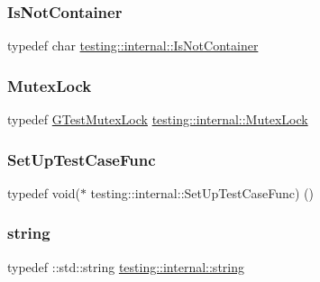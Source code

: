 \mbox{\label{namespacetesting_1_1internal_abf080521ce135deb510e0a7830fd3d33}} 
\subsubsection{\texorpdfstring{IsNotContainer}{IsNotContainer}}
{\footnotesize\ttfamily typedef char \mbox{\hyperlink{namespacetesting_1_1internal_abf080521ce135deb510e0a7830fd3d33}{testing\+::internal\+::\+Is\+Not\+Container}}}

\mbox{\label{namespacetesting_1_1internal_a08b187c6cc4e28400aadf9a32fccc8de}} 
\subsubsection{\texorpdfstring{MutexLock}{MutexLock}}
{\footnotesize\ttfamily typedef \mbox{\hyperlink{classtesting_1_1internal_1_1_g_test_mutex_lock}{G\+Test\+Mutex\+Lock}} \mbox{\hyperlink{namespacetesting_1_1internal_a08b187c6cc4e28400aadf9a32fccc8de}{testing\+::internal\+::\+Mutex\+Lock}}}

\mbox{\label{namespacetesting_1_1internal_a30037044c0b57cdd647c7e2e97cb2cff}} 
\subsubsection{\texorpdfstring{SetUpTestCaseFunc}{SetUpTestCaseFunc}}
{\footnotesize\ttfamily typedef void($\ast$ testing\+::internal\+::\+Set\+Up\+Test\+Case\+Func) ()}

\mbox{\label{namespacetesting_1_1internal_a8e8ff5b11e64078831112677156cb111}} 
\subsubsection{\texorpdfstring{string}{string}}
{\footnotesize\ttfamily typedef \+::std\+::string \mbox{\hyperlink{namespacetesting_1_1internal_a8e8ff5b11e64078831112677156cb111}{testing\+::internal\+::string}}}

